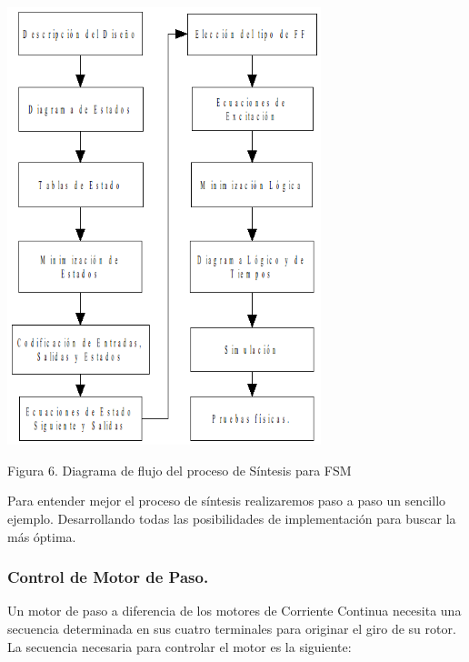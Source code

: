 {\centering \includegraphics[width=9.135cm,height=12.734cm]{./images/FSM-img6.png} \par}

{\centering Figura 6. Diagrama de flujo del proceso de Síntesis para FSM \par}

Para entender mejor el proceso de síntesis realizaremos paso a paso un sencillo ejemplo. Desarrollando todas las posibilidades de implementación para buscar la más óptima.

\subsubsection[Control de Motor de Paso.]{Control de Motor de Paso.}

Un motor de paso a diferencia de los motores de Corriente Continua necesita una secuencia determinada en sus cuatro terminales para originar el giro de su rotor. La secuencia necesaria para controlar el motor es la siguiente:

